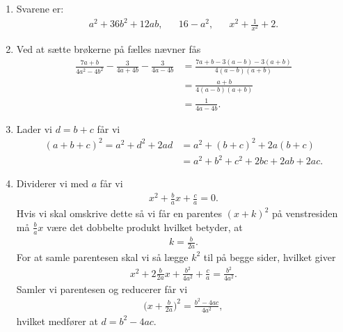 \begin{enumerate}
\item Svarene er:
\begin{align*}
a^2+36b^2+12ab,&& 16-a^2,&& x^2+\frac{1}{x^2}+2.
\end{align*}
\item Ved at sætte brøkerne på fælles nævner fås
\begin{align*}
\frac{7a +b}{4a^2-4b^2}-\frac{3}{4a+4b}-\frac{3}{4a-4b}&=\frac{7a+b-3(a-b)-3(a+b)}{4(a-b)(a+b)}\\
&=\frac{a+b}{4(a-b)(a+b)}\\
&=\frac{1}{4a-4b}.
\end{align*}
\item \label{it:4ans} Lader vi $d=b+c$ får vi
\begin{align*}
(a+b+c)^2= a^2+d^2+2ad&= a^2+(b+c)^2+2a(b+c)\\&=a^2+b^2+c^2+2bc+2ab+2ac.
\end{align*}
\item \label{it:ex13ans} Dividerer vi med $a$ får vi
\begin{align*}
x^2+\frac{b}{a}x+\frac{c}{a}=0.
\end{align*}
Hvis vi skal omskrive dette så vi får en parentes $(x+k)^2$ på venstresiden må $\frac{b}{a}x$ være det dobbelte produkt hvilket betyder, at
\begin{align*}
k=\frac{b}{2a}.
\end{align*}
For at samle parentesen skal vi så lægge $k^2$ til på begge sider, hvilket giver
\begin{align*}
x^2+2\frac{b}{2a} x+\frac{b^2}{4a^2}+\frac{c}{a}=\frac{b^2}{4a^2}.
\end{align*}
Samler vi parentesen og reducerer får vi
\begin{align*}
\Big( x+\frac{b}{2a}\Big)^2=\frac{b^2-4ac}{4a^2},
\end{align*}
hvilket medfører at $d=b^2-4ac$.


\end{enumerate}
